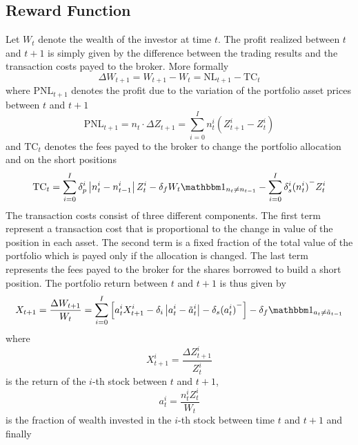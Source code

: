 \subsection{Reward Function}
Let $W_t$ denote the wealth of the investor at time $t$. The profit realized
between $t$ and $t+1$ is simply given by the difference between the trading
results and the transaction costs payed to the broker. More formally
\begin{equation*}
	\Delta W_{t+1} = W_{t+1} - W_t = \text{NL}_{t+1} - \text{TC}_{t}	
\end{equation*}
where $\text{PNL}_{t+1}$ denotes the profit due to the variation of the
portfolio asset prices between $t$ and $t+1$
\begin{equation*}
	\text{PNL}_{t+1} = {n}_t \cdot \Delta{Z}_{t+1} = \sum^{I}_{i=0} 
	n_t^i (Z_{t+1}^i - Z_t^i) 
\end{equation*}
and $\text{TC}_t$ denotes the fees payed to the broker to change the portfolio
allocation and on the short positions
\begin{equation*}
	\text{TC}_t = \sum^{I}_{i=0} \delta_p^i \left| n_t^i - n_{t-1}^i\right| Z_t^i 
				- \delta_f W_t \ind{{n}_t \neq {n}_{t-1}} 
				- \sum^{I}_{i=0} \delta_s^i {(n_t^i)}^{-} Z_t^i
\end{equation*}
The transaction costs consist of three different components. The first term 
represent a transaction cost that is proportional to the change in value of the 
position in each asset. The second term is a fixed fraction of the total value
of the portfolio which is payed only if the allocation is changed. The last
term represents the fees payed to the broker for the shares borrowed to build a
short position. The portfolio return between $t$ and $t+1$ is thus given by
\begin{equation}\label{eq:portfolio_return}
	X_{t+1} = \frac{\Delta W_{t+1}}{W_t} = \sum^{I}_{i=0} \left[ a_t^i
	X_{t+1}^i - \delta_i \left| a_t^i - \tilde{a}_t^i \right| - \delta_s
	{(a_t^i)}^- \right] - \delta_f \ind{{a}_t \neq \tilde{{a}}_{t-1}}  
\end{equation}
where 
\begin{equation*}
	X_{t+1}^i = \frac{\Delta Z_{t+1}^i}{Z_t^i}
\end{equation*}
is the return of the $i$-th stock between $t$ and $t+1$, 
\begin{equation*}
	a_t^i = \frac{n_t^i Z_t^i}{W_t}
\end{equation*}
is the fraction of wealth invested in the $i$-th stock between time $t$ and
$t+1$ and finally 
